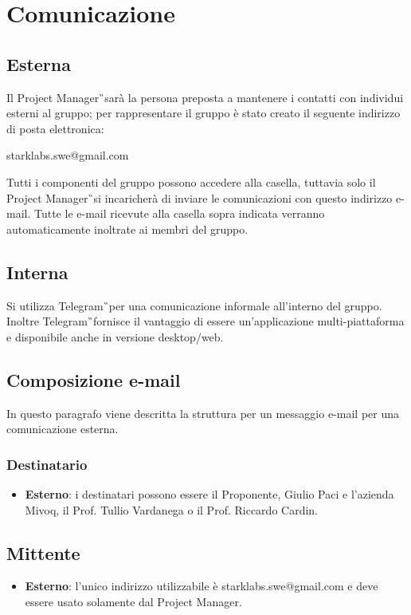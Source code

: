 \section{Comunicazione}
\subsection{Esterna}
Il Project Manager\G\ sarà la persona preposta a mantenere i contatti con 
individui esterni al gruppo; per rappresentare il gruppo è stato creato il 
seguente indirizzo di posta elettronica:
\begin{center}
	starklabs.swe@gmail.com
\end{center}
Tutti i componenti del gruppo possono accedere alla casella, tuttavia solo 
il Project Manager\G\ si incaricherà di inviare le comunicazioni con questo 
indirizzo 
e-mail. 
Tutte le e-mail ricevute alla casella sopra indicata verranno automaticamente 
inoltrate ai membri del gruppo.

\subsection{Interna}
Si utilizza Telegram\G\ per una comunicazione informale all'interno del 
gruppo. Inoltre Telegram\G\ fornisce il vantaggio di essere un'applicazione 
multi-piattaforma e disponibile anche in versione desktop/web. 

\subsection{Composizione e-mail}
In questo paragrafo viene descritta la struttura per un messaggio e-mail per 
una comunicazione esterna.

\subsubsection{Destinatario}
\begin{itemize}
	\item \textbf{Esterno}: i destinatari possono essere il Proponente, Giulio 
	Paci e l'azienda Mivoq, il Prof. Tullio Vardanega o il Prof. Riccardo 
	Cardin.
\end{itemize}

\subsection{Mittente}
\begin{itemize}
	\item \textbf{Esterno}: l'unico indirizzo utilizzabile è 
	starklabs.swe@gmail.com e deve essere usato solamente dal Project Manager.
\end{itemize}

